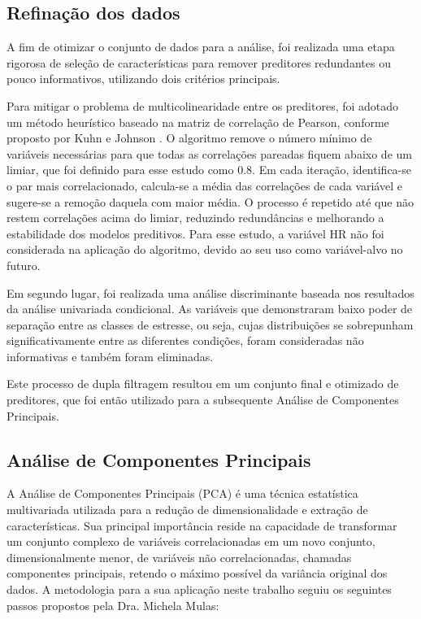 \documentclass[conference]{IEEEtran}
\begin{document}
\subsection{Refinação dos dados}
A fim de otimizar o conjunto de dados para a análise, foi realizada uma etapa rigorosa de seleção de características para remover preditores redundantes ou pouco informativos, utilizando dois critérios principais.

Para mitigar o problema de multicolinearidade entre os preditores, foi adotado um método heurístico baseado na matriz de correlação de Pearson, conforme proposto por Kuhn e Johnson \cite{b8}. O algoritmo remove o número mínimo de variáveis necessárias para que todas as correlações pareadas fiquem abaixo de um limiar, que foi definido para esse estudo como $0.8$. Em cada iteração, identifica-se o par mais correlacionado, calcula-se a média das correlações de cada variável e sugere-se a remoção daquela com maior média. O processo é repetido até que não restem correlações acima do limiar, reduzindo redundâncias e melhorando a estabilidade dos modelos preditivos. Para esse estudo, a variável HR não foi considerada na aplicação do algoritmo, devido ao seu uso como variável-alvo no futuro.

Em segundo lugar, foi realizada uma análise discriminante baseada nos resultados da análise univariada condicional. As variáveis que demonstraram baixo poder de separação entre as classes de estresse, ou seja, cujas distribuições se sobrepunham significativamente entre as diferentes condições, foram consideradas não informativas e também foram eliminadas.

Este processo de dupla filtragem resultou em um conjunto final e otimizado de preditores, que foi então utilizado para a subsequente Análise de Componentes Principais.

\subsection{Análise de Componentes Principais}

A Análise de Componentes Principais (PCA) é uma técnica estatística multivariada utilizada para a redução de dimensionalidade e extração de características. Sua principal importância reside na capacidade de transformar um conjunto complexo de variáveis correlacionadas em um novo conjunto, dimensionalmente menor, de variáveis não correlacionadas, chamadas componentes principais, retendo o máximo possível da variância original dos dados. A metodologia para a sua aplicação neste trabalho seguiu os seguintes passos propostos pela Dra. Michela Mulas\cite{b9}:
\end{document}
